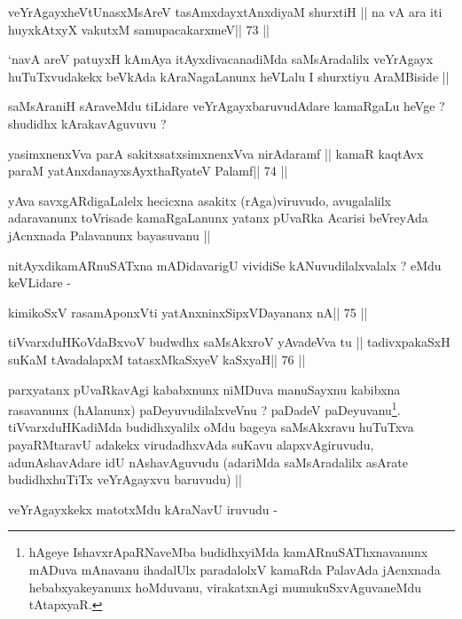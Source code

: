 \begin{shl}
veYrAgayxheVtUnasxMsAreV tasAmxdayxtAnxdiyaM shurxtiH ||
na vA ara iti huyxkAtxyX vakutxM samupacakarxmeV\hfill || 73 ||
\end{shl}

\begin{artha}
`navA areV patuyxH kAmAya itAyxdivacanadiMda saMsAradalilx veYrAgayx
  huTuTxvudakekx beVkAda kAraNagaLanunx heVLalu I shurxtiyu AraMBiside ||
\end{artha}

\begin{artha}
saMsAraniH sAraveMdu tiLidare veYrAgayxbaruvudAdare kamaRgaLu heVge ?
shudidhx kArakavAguvuvu ?
\end{artha}

\begin{shl}
yasimxnenxVva parA sakitxsatxsimxnenxVva nirAdaramf ||
kamaR kaqtAvx paraM yatAnxdanayxsAyxthaRyateV Palamf\hfill || 74 ||
\end{shl}

\begin{artha}
yAva savxgARdigaLalelx hecicxna asakitx (rAga)viruvudo, avugalalilx
adaravanunx toVrisade kamaRgaLanunx yatanx pUvaRka Acarisi beVreyAda
jAcnxnada Palavanunx bayasuvanu ||
\end{artha}

\begin{artha}
nitAyxdikamARnuSATxna mADidavarigU vividiSe kANuvudilalxvalalx ? eMdu
keVLidare -
\end{artha}

\begin{shl}
kimikoSxV rasamAponxVti yatAnxninxSipxVDayananx nA\hfill || 75 ||
\end{shl}

\begin{shl}
tiVvarxduHKoVdaBxvoV budwdhx saMsAkxroV yAvadeVva tu ||
tadivxpakaSxH suKaM tAvadalapxM tatasxMkaSxyeV kaSxyaH\hfill || 76 ||
\end{shl}

\begin{artha}
parxyatanx pUvaRkavAgi kababxnunx niMDuva manuSayxnu kabibxna
rasavanunx (hAlanunx) paDeyuvudilalxveVnu ? paDadeV
paDeyuvanu\footnote[1]{hAgeye IshavxrApaRNaveMba budidhxyiMda
  kamARnuSAThxnavanunx mADuva mAnavanu ihadalUlx paradalolxV kamaRda
  PalavAda jAcnxnada hebabxyakeyanunx hoMduvanu, virakatxnAgi
  mumukuSxvAguvaneMdu tAtapxyaR.}. tiVvarxduHKadiMda budidhxyalilx
oMdu bageya saMsAkxravu huTuTxva payaRMtaravU adakekx virudadhxvAda
suKavu alapxvAgiruvudu, adunAshavAdare idU nAshavAguvudu (adariMda
saMsAradalilx asArate budidhxhuTiTx veYrAgayxvu baruvudu) ||

veYrAgayxkekx matotxMdu kAraNavU iruvudu -
\end{artha}

